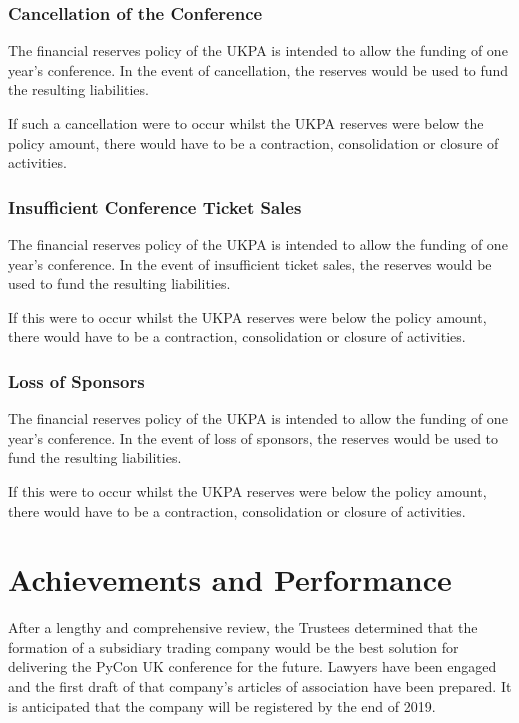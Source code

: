 \documentclass[11pt, final]{article}
\begin{document}
            \subsubsection{Cancellation of the Conference}
            The financial reserves policy of the UKPA is intended to allow the funding of one year's conference. In the event of cancellation, the reserves would be used to fund the resulting liabilities.
            
            If such a cancellation were to occur whilst the UKPA reserves were below the policy amount, there would have to be a contraction, consolidation or closure of activities.
            
            \subsubsection{Insufficient Conference Ticket Sales}
            The financial reserves policy of the UKPA is intended to allow the funding of one year's conference. In the event of insufficient ticket sales, the reserves would be used to fund the resulting liabilities.
            
            If this were to occur whilst the UKPA reserves were below the policy amount, there would have to be a contraction, consolidation or closure of activities.
              
            \subsubsection{Loss of Sponsors}
            The financial reserves policy of the UKPA is intended to allow the funding of one year's conference. In the event of loss of sponsors, the reserves would be used to fund the resulting liabilities.
            
            If this were to occur whilst the UKPA reserves were below the policy amount, there would have to be a contraction, consolidation or closure of activities.

    \section{Achievements and Performance}
        After a lengthy and comprehensive review, the Trustees determined that the formation of a subsidiary trading company would be the best solution for delivering the PyCon UK conference for the future. Lawyers have been engaged and the first draft of that company's articles of association have been prepared. It is anticipated that the company will be registered by the end of 2019.
        
\end{document}
